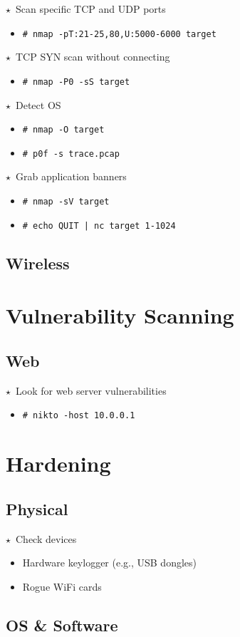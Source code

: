 \documentclass[10pt,landscape]{article}
\newcommand{\os}[1]{\texttt{\footnotesize{#1}}}
\newcommand{\unix}{\os{U}}
\newenvironment{action}[1]
  {\begin{minipage}[c]{\linewidth}$\star$~#1\begin{itemize}[leftmargin=1cm]}
  {\end{itemize}\end{minipage}\vspace*{3pt}}
\newcommand{\cmd}[2]{\item[#1] {\small\tt\# #2}}
\newcommand{\bulletpoint}[1]{\item {\small #1}}
\begin{document}
\begin{multicols*}{3}
\begin{action}{Scan specific TCP and UDP ports}
\cmd{\unix}{nmap -pT:21-25,80,U:5000-6000 target}
\end{action}

\begin{action}{TCP SYN scan without connecting}
\cmd{\unix}{nmap -P0 -sS target}
\end{action}

\begin{action}{Detect OS}
\cmd{\unix}{nmap -O target}
\cmd{\unix}{p0f -s trace.pcap}
\end{action}

\begin{action}{Grab application banners}
\cmd{\unix}{nmap -sV target}
\cmd{\unix}{echo QUIT | nc target 1-1024}
\end{action}

\subsection*{Wireless}

\section*{Vulnerability Scanning}

\subsection*{Web}
\begin{action}{Look for web server vulnerabilities}
\cmd{\unix}{nikto -host 10.0.0.1}
\end{action}

\section*{Hardening}

\subsection*{Physical}

\begin{action}{Check devices}
\bulletpoint{Hardware keylogger (e.g., USB dongles)}
\bulletpoint{Rogue WiFi cards}

\end{action}

\subsection*{OS \& Software}


\end{multicols*}
\end{document}

